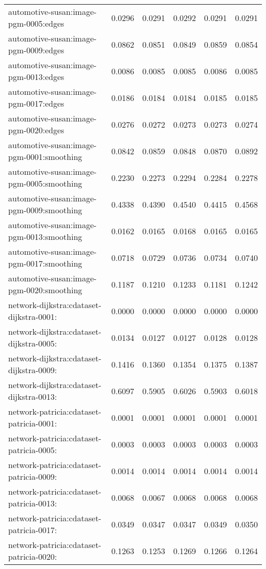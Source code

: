 \begin{longtable}{lrrrrr}
automotive-susan:image-pgm-0005:edges & 0.0296 & 0.0291 & 0.0292 & 0.0291 & 0.0291 \\
automotive-susan:image-pgm-0009:edges & 0.0862 & 0.0851 & 0.0849 & 0.0859 & 0.0854 \\
automotive-susan:image-pgm-0013:edges & 0.0086 & 0.0085 & 0.0085 & 0.0086 & 0.0085 \\
automotive-susan:image-pgm-0017:edges & 0.0186 & 0.0184 & 0.0184 & 0.0185 & 0.0185 \\
automotive-susan:image-pgm-0020:edges & 0.0276 & 0.0272 & 0.0273 & 0.0273 & 0.0274 \\
automotive-susan:image-pgm-0001:smoothing & 0.0842 & 0.0859 & 0.0848 & 0.0870 & 0.0892 \\
automotive-susan:image-pgm-0005:smoothing & 0.2230 & 0.2273 & 0.2294 & 0.2284 & 0.2278 \\
automotive-susan:image-pgm-0009:smoothing & 0.4338 & 0.4390 & 0.4540 & 0.4415 & 0.4568 \\
automotive-susan:image-pgm-0013:smoothing & 0.0162 & 0.0165 & 0.0168 & 0.0165 & 0.0165 \\
automotive-susan:image-pgm-0017:smoothing & 0.0718 & 0.0729 & 0.0736 & 0.0734 & 0.0740 \\
automotive-susan:image-pgm-0020:smoothing & 0.1187 & 0.1210 & 0.1233 & 0.1181 & 0.1242 \\
network-dijkstra:cdataset-dijkstra-0001: & 0.0000 & 0.0000 & 0.0000 & 0.0000 & 0.0000 \\
network-dijkstra:cdataset-dijkstra-0005: & 0.0134 & 0.0127 & 0.0127 & 0.0128 & 0.0128 \\
network-dijkstra:cdataset-dijkstra-0009: & 0.1416 & 0.1360 & 0.1354 & 0.1375 & 0.1387 \\
network-dijkstra:cdataset-dijkstra-0013: & 0.6097 & 0.5905 & 0.6026 & 0.5903 & 0.6018 \\
network-patricia:cdataset-patricia-0001: & 0.0001 & 0.0001 & 0.0001 & 0.0001 & 0.0001 \\
network-patricia:cdataset-patricia-0005: & 0.0003 & 0.0003 & 0.0003 & 0.0003 & 0.0003 \\
network-patricia:cdataset-patricia-0009: & 0.0014 & 0.0014 & 0.0014 & 0.0014 & 0.0014 \\
network-patricia:cdataset-patricia-0013: & 0.0068 & 0.0067 & 0.0068 & 0.0068 & 0.0068 \\
network-patricia:cdataset-patricia-0017: & 0.0349 & 0.0347 & 0.0347 & 0.0349 & 0.0350 \\
network-patricia:cdataset-patricia-0020: & 0.1263 & 0.1253 & 0.1269 & 0.1266 & 0.1264 \\

\end{longtable}
